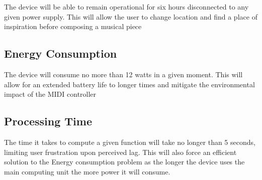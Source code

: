 The device will be able to remain operational for six hours disconnected to any
given power supply. This will allow the user to change location and find a place
of inspiration before composing a musical piece

\subsection{Energy Consumption}

The device will consume no more than 12 watts in a given moment. This will allow
for an extended battery life to longer times and mitigate the environmental
impact of the MIDI controller

\subsection{Processing Time}

The time it takes to compute a given function will take no longer than 5
seconds, limiting user frustration upon perceived lag. This will also force an
efficient solution to the Energy consumption problem as the longer the device
uses the main computing unit the more power it will consume.
